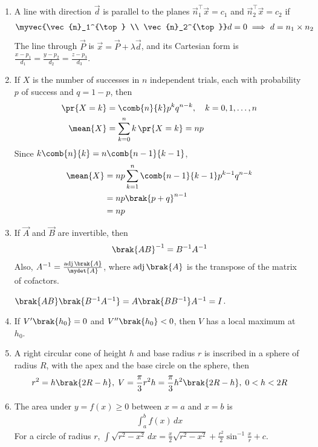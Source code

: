 \begin{enumerate}[label=\thesubsection.\arabic*, ref=\thesubsection.\theenumi]
\item A line with direction $\vec{d}$ is parallel to the planes $\vec{n}_1^{\top}\vec{x} = c_1$ and $\vec{n}_2^{\top}\vec{x} = c_2$ if
\begin{align}
	\myvec{\vec{n}_1^{\top} \\ \vec{n}_2^{\top}}\vec{d} = \vec{0} \implies \vec{d} = \vec{n}_1\times\vec{n}_2 \label{eq:EE26BTECH11205-line-planes}
\end{align}
The line through $\vec{P}$ is $\vec{x} = \vec{P} + \lambda\vec{d}$, and its Cartesian form is $\frac{x-p_1}{d_1} = \frac{y-p_2}{d_2} = \frac{z-p_3}{d_3}$.
\item If $X$ is the number of successes in $n$ independent trials, each with probability $p$ of success and $q = 1-p$, then
\begin{align}
	\pr{X=k} &= \comb{n}{k}p^kq^{n-k}, \quad k = 0,1,\dots,n \label{eq:EE26BTECH11205-binom-pmf}
	\\
	\mean{X} &= \sum_{k=0}^{n}k\,\pr{X=k} = np \label{eq:EE26BTECH11205-binom-mean}
\end{align}
\solution Since $k\comb{n}{k} = n\comb{n-1}{k-1}$,
\begin{align}
	\mean{X} &= np\sum_{k=1}^{n}\comb{n-1}{k-1}p^{k-1}q^{n-k} \notag
	\\
	&= np\brak{p+q}^{n-1} \notag
	\\
	&= np
\end{align}
\item If $\vec{A}$ and $\vec{B}$ are invertible, then
\begin{align}
	\brak{\vec{A}\vec{B}}^{-1} = \vec{B}^{-1}\vec{A}^{-1} \label{eq:EE26BTECH11205-inv-prod}
\end{align}
Also, $\vec{A}^{-1} = \frac{\operatorname{adj}\brak{\vec{A}}}{\mydet{\vec{A}}}$, where $\operatorname{adj}\brak{\vec{A}}$ is the transpose of the matrix of cofactors. \label{eq:EE26BTECH11205-adjugate}

\medskip
\solution $\brak{\vec{A}\vec{B}}\brak{\vec{B}^{-1}\vec{A}^{-1}} = \vec{A}\brak{\vec{B}\vec{B}^{-1}}\vec{A}^{-1} = \vec{I}$.
\item If $V^{\prime}\brak{h_0} = 0$ and $V^{\prime\prime}\brak{h_0} < 0$, then $V$ has a local maximum at $h_0$. \label{eq:EE26BTECH11205-second-deriv}
\item A right circular cone of height $h$ and base radius $r$ is inscribed in a sphere of radius $R$, with the apex and the base circle on the sphere, then
\begin{align}
	r^2 = h\brak{2R-h},\; V = \frac{\pi}{3}r^2h = \frac{\pi}{3}h^2\brak{2R-h},\; 0<h<2R \label{eq:EE26BTECH11205-cone-vol}
\end{align}
\item The area under $y = f(x) \ge 0$ between $x=a$ and $x=b$ is
\begin{align}
	\int_{a}^{b}f(x)\,dx \label{eq:EE26BTECH11205-area-int}
\end{align}
For a circle of radius $r$, $\int\sqrt{r^2-x^2}\,dx = \frac{x}{2}\sqrt{r^2-x^2} + \frac{r^2}{2}\sin^{-1}\frac{x}{r} + c$.


\end{enumerate}
